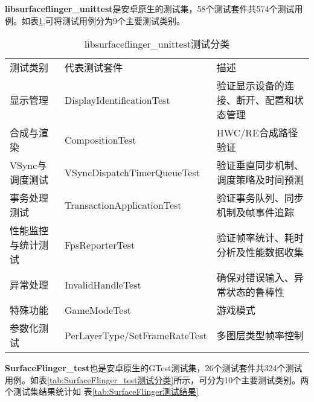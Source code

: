 \textbf{libsurfaceflinger\_unittest}是安卓原生的测试集，58个测试套件共574个测试用例。如表\ref{tab:libsurfaceflinger_unittest测试分类},可将测试用例分为9个主要测试类别。

\begin{table}[h]
    \centering
    \caption{libsurfaceflinger\_unittest测试分类}
    \label{tab:libsurfaceflinger_unittest测试分类}
    \begin{tabular}{lll}
        \toprule
        测试类别 & 代表测试套件	& 描述 \\
        显示管理 & DisplayIdentificationTest & 验证显示设备的连接、断开、配置和状态管理 \\
        合成与渲染 & CompositionTest & HWC/RE合成路径验证 \\
        VSync与调度测试 & VSyncDispatchTimerQueueTest & 验证垂直同步机制、调度策略及时间预测 \\
        事务处理测试 & TransactionApplicationTest & 验证事务队列、同步机制及帧事件追踪 \\
        性能监控与统计测试 & FpsReporterTest & 验证帧率统计、耗时分析及性能数据收集 \\
        异常处理 & InvalidHandleTest & 确保对错误输入、异常状态的鲁棒性 \\
        特殊功能 & GameModeTest & 游戏模式 \\  
        参数化测试 &  PerLayerType/SetFrameRateTest & 多图层类型帧率控制 \\
        \bottomrule
    \end{tabular}
    \note{}
\end{table}

\textbf{SurfaceFlinger\_test}也是安卓原生的GTest测试集，26个测试套件共324个测试用例。如表\ref{tab:SurfaceFlinger_test测试分类}所示，可分为10个主要测试类别。两个测试集结果统计如
表\ref{tab:SurfaceFlinger测试结果}

